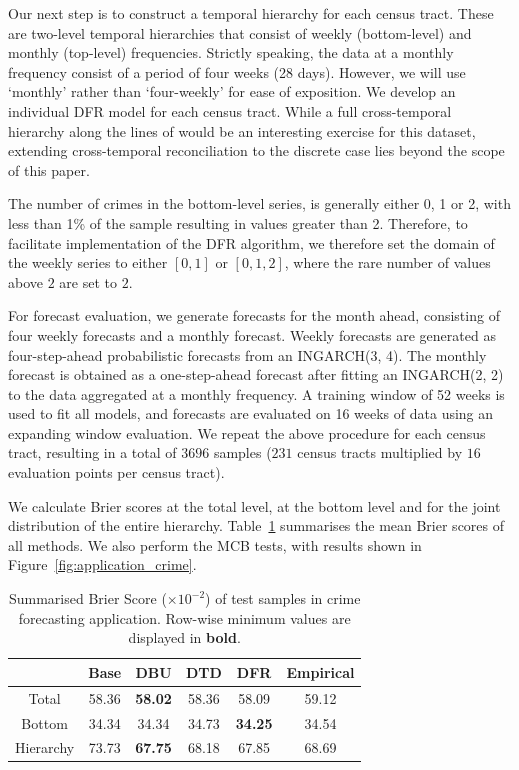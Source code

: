 \documentclass[a4paper,review,11pt,authoryear]{elsarticle}
\theoremstyle{definition}
\begin{document}
     
     Our next step is to construct a temporal hierarchy for each census tract. These are two-level temporal hierarchies that consist of weekly (bottom-level) and monthly (top-level) frequencies. Strictly speaking, the data at a monthly frequency consist of a period of four weeks (28 days). However, we will use `monthly' rather than `four-weekly' for ease of exposition. We develop an individual DFR model for each census tract. While a full cross-temporal hierarchy along the lines of \cite{kourentzesCrosstemporalCoherentForecasts2019} would be an interesting exercise for this dataset, extending cross-temporal reconciliation to the discrete case lies beyond the scope of this paper.
     
     The number of crimes in the bottom-level series, is generally either 0, 1 or 2, with less than 1\% of the sample resulting in values greater than 2. Therefore, to facilitate implementation of the DFR algorithm, we therefore set the domain of the weekly series to either $[0, 1]$ or $[0, 1, 2]$, where the rare number of values above $2$ are set to $2$.

     For forecast evaluation, we generate forecasts for the month ahead, consisting of four weekly forecasts and a monthly forecast. Weekly forecasts are generated as four-step-ahead probabilistic forecasts from an INGARCH(3, 4). The monthly forecast is obtained as a one-step-ahead forecast after fitting an INGARCH(2, 2) to the data aggregated at a monthly frequency.
     A training window of 52 weeks is used to fit all models, and forecasts are evaluated on 16 weeks of data using an expanding window evaluation. We repeat the above procedure for each census tract, resulting in a total of $3696$ samples ($231$ census tracts multiplied by $16$ evaluation points per census tract).
     
     We calculate Brier scores at the total level, at the bottom level and for the joint distribution of the entire hierarchy.
     Table~\ref{tab:crime_bs} summarises the mean Brier scores of all methods. We also perform the MCB tests, with results shown in Figure~\ref{fig:application_crime}.

     \begin{table}[h]
       \centering
       \caption{\label{tab:crime_bs}Summarised Brier Score ($\times 10^{-2}$) of test samples in crime forecasting application. Row-wise minimum values are displayed in \textbf{bold}.}
       \begin{tabular}{cccccc}
       \toprule
       ~ & Base & DBU & DTD & DFR & Empirical \\\midrule 
       Total & 58.36 & \textbf{58.02} & 58.36 & 58.09 & 59.12 \\ 
       Bottom & 34.34 & 34.34 & 34.73 & \textbf{34.25} & 34.54 \\ 
       Hierarchy & 73.73 & \textbf{67.75} & 68.18 & {67.85} & 68.69 \\ 
       \bottomrule
       \end{tabular}
       \end{table}
\end{document}
